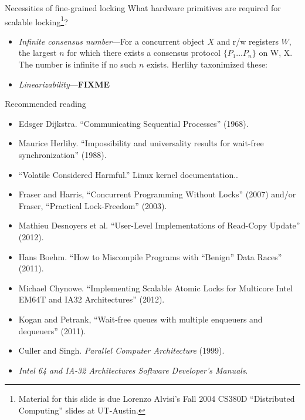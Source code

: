 \documentclass[mathserif,xcolor={dvipsnames,table}]{beamer}
\begin{document}
\begin{frame}{Necessities of fine-grained locking}
What hardware primitives are required for scalable locking\footnote{Material for this slide is due Lorenzo Alvisi's Fall 2004 CS380D ``Distributed Computing'' slides at UT-Austin.}?
\vfill
\begin{itemize}
\item \textit{Infinite consensus number}---For a concurrent object $X$ and
r/w registers $W$, the largest $n$ for which there exists
a consensus protocol $\{P_1\ldots P_n\}$ on {W, X}. The number is infinite if no
such $n$ exists. Herlihy taxonimized these:
\begin{center}
\end{center}
\item \textit{Linearizability}---\textbf{FIXME}
\end{itemize}
\end{frame}

\begin{frame}{Recommended reading}
\small{
\begin{itemize}
\item Edsger Dijkstra. ``Communicating Sequential Processes'' (1968).
\item Maurice Herlihy. ``Impossibility and universality results for wait-free synchronization'' (1988).
\item ``Volatile Considered Harmful.'' Linux kernel documentation..
\item Fraser and Harris, ``Concurrent Programming Without Locks'' (2007) and/or Fraser,
	``Practical Lock-Freedom'' (2003).
\item Mathieu Desnoyers et al. ``User-Level Implementations of Read-Copy Update'' (2012).
\item Hans Boehm. ``How to Miscompile Programs with ``Benign'' Data Races'' (2011).
\item Michael Chynowe. ``Implementing Scalable Atomic Locks for Multicore Intel EM64T and IA32 Architectures'' (2012).
\item Kogan and Petrank, ``Wait-free queues with multiple enqueuers and dequeuers'' (2011).
\item Culler and Singh. \textit{Parallel Computer Architecture} (1999). 
\item \textit{Intel 64 and IA-32 Architectures Software Developer's Manuals}.
\end{itemize}
}
\end{frame}
\end{document}

